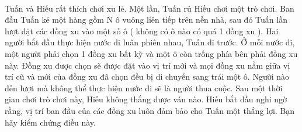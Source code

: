  

Tuấn và Hiếu rất thích chơi xu lẻ. Một lần, Tuấn rủ Hiếu chơi một trò chơi. Ban đầu Tuấn kẻ một hàng gồm N ô vuông liên tiếp trên nền nhà, sau đó Tuấn lần lượt đặt các đồng xu vào một số ô ( không có ô nào có quá 1 đồng xu ). Hai người bắt đầu thực hiện nước đi luân phiên nhau, Tuấn đi trước. Ở mỗi nước đi, một người phải chọn 1 đồng xu bất kỳ và một ô còn trống phía bên phải đồng xu này. Đồng xu được chọn sẽ được đặt vào vị trí mới và mọi đồng xu nằm giữa vị trí cũ và mới của đồng xu đã chọn đều bị di chuyển sang trái một ô. Người nào đến lượt mà không thể thực hiện nước đi sẽ là người thua cuộc. Sau một thời gian chơi trò chơi này, Hiếu không thắng được ván nào. Hiếu bắt đầu nghi ngờ rằng, vị trí ban đầu của các đồng xu luôn đảm bảo cho Tuấn một thắng lợi. Bạn hãy kiểm chứng điều này.